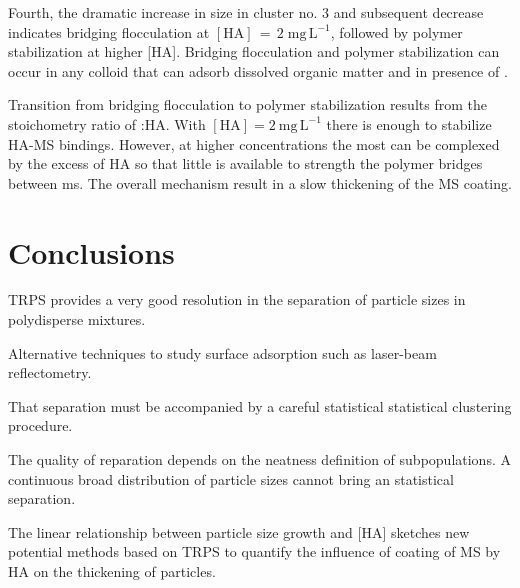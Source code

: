 \documentclass[journal=langd5,manuscript=article]{achemso}
\begin{document}
Fourth, the dramatic increase in size in cluster no. 3 
and subsequent decrease indicates bridging flocculation at 
$\mathrm{[HA] \,=\, 2\;mg\,L^{-1}}$, followed by polymer stabilization at higher [HA]. %
Bridging flocculation and polymer stabilization can occur in any colloid that can adsorb dissolved organic matter and in presence of .

Transition from bridging flocculation to polymer stabilization results from the stoichometry ratio of 
:HA.
With 
$\mathrm{[HA]} = 2~\mathrm{mg\,L^{-1}}$ there is enough 
 to stabilize HA-MS bindings. However, at higher concentrations
the most
can be  complexed by the excess of HA  so that little
is available to strength the polymer bridges between ms.
The overall mechanism  result in a slow thickening of the MS coating. 

















 










\section{Conclusions}



TRPS provides a very good resolution in the separation  of particle sizes in polydisperse mixtures.



Alternative techniques to study surface adsorption such as laser-beam reflectometry.

That separation must be accompanied by a careful statistical statistical clustering procedure.

The quality of reparation depends on the neatness definition of subpopulations. A continuous broad distribution of particle sizes cannot bring an statistical separation.

The linear relationship  between particle size growth and [HA] sketches new potential methods based on TRPS to
quantify the influence of coating of MS by HA on the thickening of particles.
\end{document}
